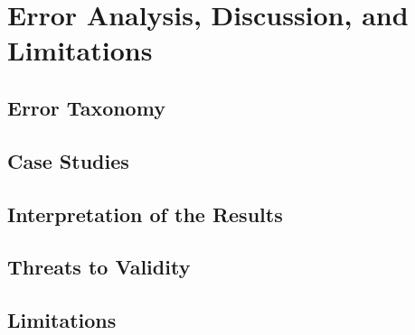 \chapter{Error Analysis, Discussion, and Limitations}
\label{chap:discussion}


\section{Error Taxonomy}
\label{sec:error_taxonomy}

\section{Case Studies}
\label{sec:case_studies}

\section{Interpretation of the Results}
\label{sec:interpretation}

\section{Threats to Validity}
\label{sec:threats}

\section{Limitations}
\label{sec:limitations}
